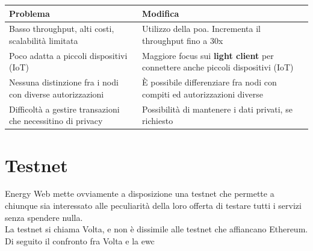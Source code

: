 \documentclass[12pt, letterpaper, twoside]{article}
\begin{document}
\begin{tabular}{||p{7cm}|p{7cm}||}
    \hline
    Problema                                                    & Modifica                                                                                \\
    \hline\hline
    Basso throughput, alti costi, scalabilità limitata          & Utilizzo della \gls{poa}. Incrementa il throughput fino a 30x                           \\
    \hline
    Poco adatta a piccoli dispositivi (IoT)                     & Maggiore focus sui \textbf{light client} per connettere anche piccoli dispositivi (IoT) \\
    \hline
    Nessuna distinzione fra i nodi con diverse autorizzazioni   & È possibile differenziare fra nodi con compiti ed autorizzazioni diverse                \\
    \hline
    Difficoltà a gestire transazioni che necessitino di privacy & Possibilità di mantenere i dati privati, se richiesto                                   \\[1ex]
    \hline
\end{tabular}

\newpage

\section{Testnet}
Energy Web mette ovviamente a disposizione una testnet che permette a chiunque sia interessato alle peculiarità della loro offerta di testare tutti i servizi senza spendere nulla. \\
La testnet si chiama Volta, e non è dissimile alle testnet che affiancano Ethereum. \\

Di seguito il confronto fra Volta e la \gls{ewc}
\end{document}
